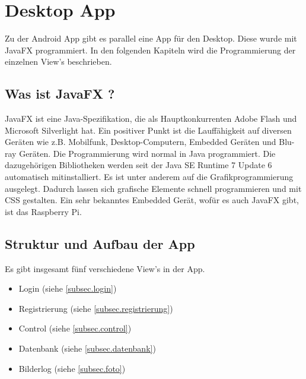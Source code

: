 
\chapter{Desktop App}
Zu der Android App gibt es parallel eine App für den Desktop. Diese wurde mit JavaFX  programmiert. In den folgenden Kapiteln wird die Programmierung der einzelnen View's beschrieben.

				
				
\section{Was ist JavaFX ?}
JavaFX ist eine Java-Spezifikation, die als Hauptkonkurrenten Adobe Flash und Microsoft Silverlight hat. Ein positiver Punkt ist die Lauffähigkeit auf diversen Geräten wie z.B. Mobilfunk, Desktop-Computern, Embedded Geräten und Blu-ray Geräten. Die Programmierung wird normal in Java programmiert. Die dazugehörigen Bibliotheken werden seit der Java SE Runtime 7 Update 6 automatisch mitinstalliert. Es ist unter anderem auf die Grafikprogrammierung ausgelegt. Dadurch lassen sich grafische Elemente schnell programmieren und mit CSS gestalten.
Ein sehr bekanntes Embedded Gerät, wofür es auch JavaFX gibt, ist das Raspberry Pi. \cite{bib.jFXRaspPi}

\section{Struktur und Aufbau der App}
Es gibt insgesamt fünf verschiedene View's in der App.
\begin{itemize}
	\item Login (siehe \ref{subsec.login})
	\item Registrierung (siehe \ref{subsec.registrierung})
	\item Control (siehe \ref{subsec.control})
	\item Datenbank (siehe \ref{subsec.datenbank})
	\item Bilderlog (siehe \ref{subsec.foto})
\end{itemize}

